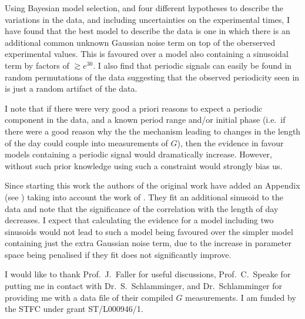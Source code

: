 \documentclass[doublecol]{epl2}
\begin{document}
Using Bayesian model selection, and four different hypotheses to describe the variations in the data, and including
uncertainties on the experimental times, I have found that the best model to describe the data is one in which
there is an additional common unknown Gaussian noise term on top of the oberserved experimental values. This is 
favoured over a model also containing a sinusoidal term by factors of $\gtrsim e^{30}$. I also find that periodic
signals can easily be found in random permutations of the data suggesting that the observed periodicity seen in
\cite{2015EL....11010002A} is just a random artifact of the data.

I note that if there were very good a priori reasons to expect a periodic component in the data, and a known
period range and/or initial phase (i.e.\ if there were a good reason why the the mechanism leading to changes in the
length of the day could couple into measurements of $G$), then the evidence in favour models containing a periodic
signal would dramatically increase. However, without such prior knowledge using such a constraint would strongly bias
us.

Since starting this work the authors of the original work have added an Appendix (see \cite{AndersonRevised}) taking
into account the work of \cite{2015arXiv150501774S}. They fit an additional sinusoid to the data and note that the
significance of the correlation with the length of day decreases. I expect that calculating the evidence for a model
including two sinusoids would not lead to such a model being favoured over the simpler model containing just the
extra Gaussian noise term, due to the increase in parameter space being penalised if they fit does not significantly
improve.

\acknowledgements

I would like to thank Prof.\ J.\ Faller for useful discussions, Prof.\ C.\ Speake for putting me in contact with
Dr.\ S.\ Schlamminger, and Dr.\ Schlamminger for providing me with a data file of their compiled $G$ measurements.
I am funded by the STFC under grant ST/L000946/1.



\end{document}
